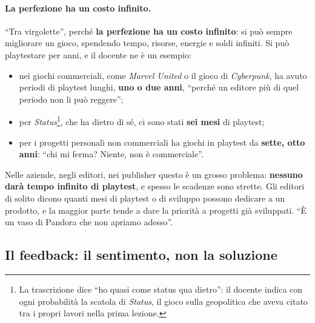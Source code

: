 \paragraph{La perfezione ha un costo infinito.} ``Tra virgolette'', perché
\textbf{la perfezione ha un costo infinito}: si può sempre migliorare un gioco,
spendendo tempo, risorse, energie e soldi infiniti. Si può playtestare per anni,
e il docente ne è un esempio:
\begin{itemize}
  \item nei giochi commerciali, come \emph{Marvel United} o il gioco di
        \emph{Cyberpunk}, ha avuto periodi di playtest lunghi, \textbf{uno o due
        anni}, ``perché un editore più di quel periodo non li può reggere'';
  \item per \emph{Status}\footnote{La trascrizione dice ``ho quasi come status
        qua dietro'': il docente indica con ogni probabilità la scatola di
        \emph{Status}, il gioco sulla geopolitica che aveva citato tra i propri
        lavori nella prima lezione.}, che ha dietro di sé, ci sono stati
        \textbf{sei mesi} di playtest;
  \item per i progetti personali non commerciali ha giochi in playtest da
        \textbf{sette, otto anni}: ``chi mi ferma? Niente, non è commerciale''.
\end{itemize}
Nelle aziende, negli editori, nei publisher questo è un grosso problema:
\textbf{nessuno darà tempo infinito di playtest}, e spesso le scadenze sono
strette. Gli editori di solito dicono quanti mesi di playtest o di sviluppo
possono dedicare a un prodotto, e la maggior parte tende a dare la priorità a
progetti già sviluppati. ``È un vaso di Pandora che non apriamo adesso''.

\subsection{Il feedback: il sentimento, non la soluzione}



